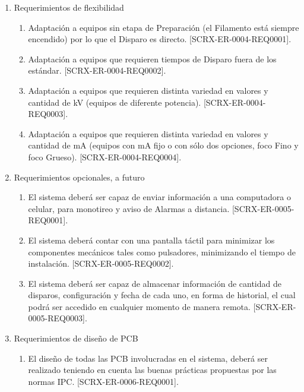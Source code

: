 \documentclass[
11pt, %
]{charter}
\begin{document}
\begin{enumerate}
	\newpage
	\item Requerimientos de flexibilidad
		\begin{enumerate}
			\item Adaptación a equipos sin etapa de Preparación (el Filamento está siempre encendido) por lo que el Disparo es directo. [SCRX-ER-0004-REQ0001].
			\item Adaptación a equipos que requieren tiempos de Disparo fuera de los estándar. [SCRX-ER-0004-REQ0002].
			\item Adaptación a equipos que requieren distinta variedad en valores y cantidad de kV (equipos de diferente potencia). [SCRX-ER-0004-REQ0003].
			\item Adaptación a equipos que requieren distinta variedad en valores y cantidad de mA (equipos con mA fijo o con sólo dos opciones, foco Fino y foco Grueso). [SCRX-ER-0004-REQ0004]. 
		\end{enumerate}
	\item Requerimientos opcionales, a futuro
		\begin{enumerate}
			\item El sistema deberá ser capaz de enviar información a una computadora o celular, para monotireo y aviso de Alarmas a distancia. [SCRX-ER-0005-REQ0001].
			\item El sistema deberá contar con una pantalla táctil para minimizar los componentes mecánicos tales como pulsadores, minimizando el tiempo de instalación. [SCRX-ER-0005-REQ0002].
			\item El sistema deberá ser capaz de almacenar información de cantidad de disparos, configuración y fecha de cada uno, en forma de historial, el cual podrá ser accedido en cualquier momento de manera remota. [SCRX-ER-0005-REQ0003].
		\end{enumerate}
	
	\item Requerimientos de diseño de PCB
		\begin{enumerate}
			\item El diseño de todas las PCB involucradas en el sistema, deberá ser realizado teniendo en cuenta las buenas prácticas propuestas por las normas IPC. [SCRX-ER-0006-REQ0001].
		\end{enumerate}
\end{enumerate}

\end{document}
